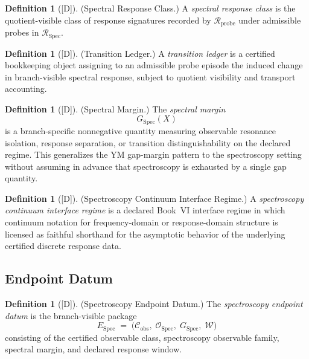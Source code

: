 \documentclass[12pt,oneside]{amsbook}
\theoremstyle{plain}
\theoremstyle{definition}
\newtheorem{definition}[theorem]{Definition}
\theoremstyle{remark}
\newcommand{\status}[1]{\textup{[#1]}}
\begin{document}
\begin{definition}[\status{D}]\label{def:spectral-response-class}
\textup{(Spectral Response Class.)}
A \emph{spectral response class} is the quotient-visible class of response
signatures recorded by $\mathcal{R}_{\mathrm{probe}}$ under admissible
probes in $\mathcal{R}_{\mathrm{Spec}}$.
\end{definition}

\begin{definition}[\status{D}]\label{def:transition-ledger}
\textup{(Transition Ledger.)}
A \emph{transition ledger} is a certified bookkeeping object assigning to
an admissible probe episode the induced change in branch-visible spectral
response, subject to quotient visibility and transport accounting.
\end{definition}

\begin{definition}[\status{D}]\label{def:spectral-margin}
\textup{(Spectral Margin.)}
The \emph{spectral margin}
\[
 G_{\mathrm{Spec}}(X)
\]
is a branch-specific nonnegative quantity measuring observable resonance
isolation, response separation, or transition distinguishability on the
declared regime. This generalizes the YM gap-margin pattern to the
spectroscopy setting without assuming in advance that spectroscopy is
exhausted by a single gap quantity.
\end{definition}

\begin{definition}[\status{D}]\label{def:spec-continuum-interface}
\textup{(Spectroscopy Continuum Interface Regime.)}
A \emph{spectroscopy continuum interface regime} is a declared Book~VI
interface regime in which continuum notation for frequency-domain or
response-domain structure is licensed as faithful shorthand for the
asymptotic behavior of the underlying certified discrete response data.
\end{definition}

\subsection{Endpoint Datum}\label{sec:spec-endpoint}

\begin{definition}[\status{D}]\label{def:spec-endpoint}
\textup{(Spectroscopy Endpoint Datum.)}
The \emph{spectroscopy endpoint datum} is the branch-visible package
\[
 E_{\mathrm{Spec}} \;=\;
 \bigl(\mathcal{C}_{\mathrm{obs}},\;
 \mathcal{O}_{\mathrm{Spec}},\;
 G_{\mathrm{Spec}},\;
 \mathcal{W}\bigr)
\]
consisting of the certified observable class, spectroscopy observable
family, spectral margin, and declared response window.
\end{definition}
\end{document}
